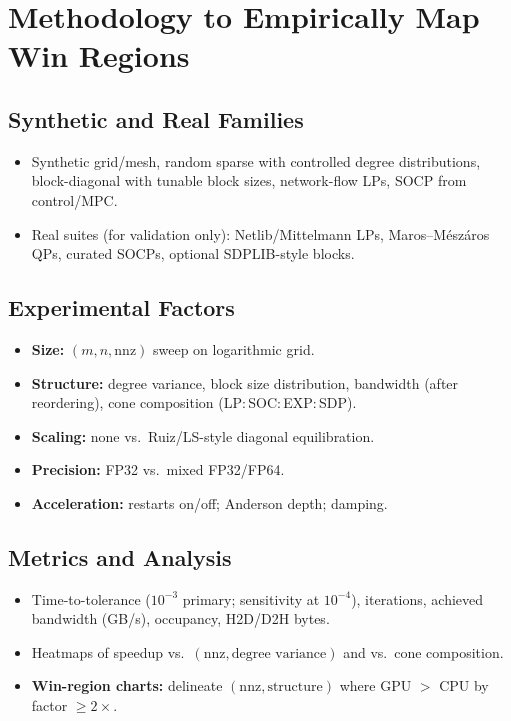 \documentclass[12pt]{article}
\begin{document}
\section*{Methodology to Empirically Map Win Regions}
\subsection*{Synthetic and Real Families}
\begin{itemize}
  \item Synthetic grid/mesh, random sparse with controlled degree distributions, block-diagonal with tunable block sizes, network-flow LPs, SOCP from control/MPC.
  \item Real suites (for validation only): Netlib/Mittelmann LPs, Maros--Mészáros QPs, curated SOCPs, optional SDPLIB-style blocks.
\end{itemize}

\subsection*{Experimental Factors}
\begin{itemize}
  \item \textbf{Size:} $(m,n,\mathrm{nnz})$ sweep on logarithmic grid.
  \item \textbf{Structure:} degree variance, block size distribution, bandwidth (after reordering), cone composition (LP:\,SOC:\,EXP:\,SDP).
  \item \textbf{Scaling:} none vs.\ Ruiz/LS-style diagonal equilibration.
  \item \textbf{Precision:} FP32 vs.\ mixed FP32/FP64.
  \item \textbf{Acceleration:} restarts on/off; Anderson depth; damping.
\end{itemize}

\subsection*{Metrics and Analysis}
\begin{itemize}
  \item Time-to-tolerance ($10^{-3}$ primary; sensitivity at $10^{-4}$), iterations, achieved bandwidth (GB/s), occupancy, H2D/D2H bytes.
  \item Heatmaps of speedup vs.\ $(\mathrm{nnz}, \text{degree variance})$ and vs.\ cone composition.
  \item \textbf{Win-region charts:} delineate $(\mathrm{nnz}, \text{structure})$ where GPU $>$ CPU by factor $\ge 2\times$.
\end{itemize}
\end{document}
